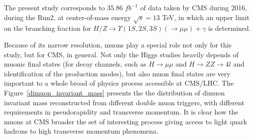 The present study corresponds to 35.86 $fb^{-1}$ of data taken by CMS during 2016, during the Run2, at center-of-mass energy $\sqrt{s} = 13$ TeV, in which an upper limit on the branching fraction for $H/Z \rightarrow \Upsilon(1S, 2S, 3S) (\rightarrow \mu\mu) + \gamma $ is determined.

Because of its narrow resolution, muons play a special role not only for this study, but for CMS, in general. Not only the Higgs studies heavily depends of muonic final states (for decay channels, such as $H \rightarrow \mu\mu$ and $H \rightarrow ZZ \rightarrow 4l$ and identification of the production modes), but also muon final states are very important to a whole broad of physics process accessible at CMS/LHC. The Figure~\ref{dimuon_invariant_mass} presents the the distribution of dimuon invariant mass reconstructed from different double muon triggers, with different requirements in pseudorapidity and transverse momentum. It is clear how the muons at CMS broader the set of interesting process giving access to light quark hadrons to high transverse momentum phenomena.

